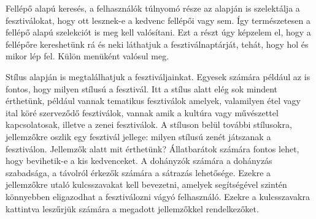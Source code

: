 Fellépő alapú keresés, a felhasználók túlnyomó része az alapján is szelektálja a fesztiválokat, hogy ott lesznek-e a kedvenc fellépői vagy sem. Így természetesen a fellépő alapú szelekciót is meg kell valósítani. Ezt a részt úgy képzelem el, hogy a fellépőre kereshetünk rá és neki láthatjuk a fesztiválnaptárját, tehát, hogy hol és mikor lép fel. Külön menüként valósul meg.

Stílus alapján is megtalálhatjuk a fesztiváljainkat. Egyesek számára például az is fontos, hogy milyen stílusú a fesztivál. Itt a stílus alatt elég sok mindent érthetünk, például vannak tematikus fesztiválok amelyek, valamilyen étel vagy ital köré szerveződő fesztiválok, vannak amik a kultúra vagy művészettel kapcsolatosak, illetve a zenei fesztiválok. A stíluson belül további stílusokra, jellemzőkre oszlik egy fesztivál jellege:  milyen stílusú zenét játszanak a fesztiválon. Jellemzők alatt mit érthetünk? Állatbarátok számára fontos lehet, hogy bevihetik-e  a kis kedvenceket. A dohányzók számára a dohányzás szabadsága, a távolról érkezők számára  a sátrazás lehetősége. Ezekre a jellemzőkre utaló kulcsszavakat kell bevezetni, amelyek segítségével szintén könnyebben eligazodhat a fesztiválozni vágyó felhasználó. Ezekre a kulcsszavakra kattintva leszűrjük számára a megadott jellemzőkkel rendelkezőket.

